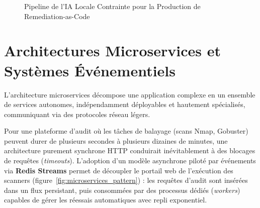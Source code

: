 \begin{figure}[H]
\centering
{}
\caption{Pipeline de l'IA Locale Contrainte pour la Production de Remediation-as-Code}
\label{fig:ai_pipeline}
\end{figure}

\section{Architectures Microservices et Syst\`emes \'Ev\'enementiels}
\par L'architecture microservices d\'ecompose une application complexe en un ensemble de services autonomes, ind\'ependamment d\'eployables et hautement sp\'ecialis\'es, communiquant via des protocoles r\'eseau l\'egers.
\par Pour une plateforme d'audit o\`u les t\^aches de balayage (scans Nmap, Gobuster) peuvent durer de plusieurs secondes \`a plusieurs dizaines de minutes, une architecture purement synchrone HTTP conduirait in\'evitablement \`a des blocages de requ\^etes (\textit{timeouts}). L'adoption d'un mod\`ele asynchrone pilot\'e par \'ev\'enements via \textbf{Redis Streams} permet de d\'ecoupler le portail web de l'ex\'ecution des scanners (figure~\ref{fig:microservices_pattern}) : les requ\^etes d'audit sont ins\'er\'ees dans un flux persistant, puis consomm\'ees par des processus d\'edi\'es (\textit{workers}) capables de g\'erer les r\'eessais automatiques avec repli exponentiel.

